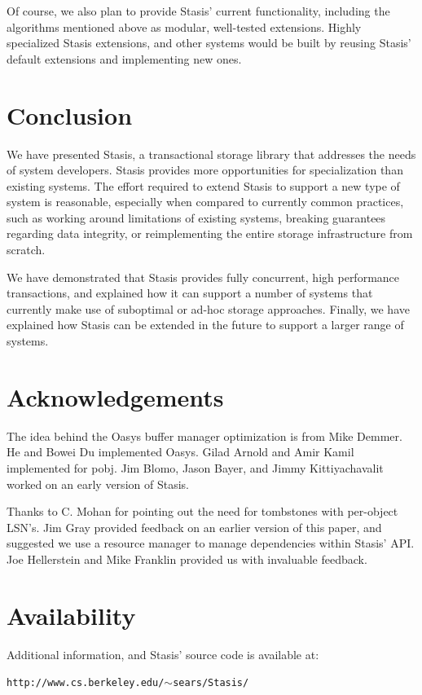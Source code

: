 \documentclass[letterpaper,twocolumn,10pt]{article}
\newcommand{\yad}{Stasis\xspace}
\newcommand{\yads}{Stasis'\xspace}
\newcommand{\oasys}{Oasys\xspace}
\begin{document}
Of course, we also plan to provide \yads current functionality, including the algorithms
mentioned above as modular, well-tested extensions.
Highly specialized \yad extensions, and other systems would be built
by reusing \yads default extensions and implementing new ones.


\section{Conclusion}

We have presented \yad, a transactional storage library that addresses
the needs of system developers.  \yad provides more opportunities for
specialization than existing systems.  The effort required to extend
\yad to support a new type of system is reasonable, especially when
compared to currently common practices, such as working around
limitations of existing systems, breaking guarantees regarding data
integrity, or reimplementing the entire storage infrastructure from
scratch.

We have demonstrated that \yad provides fully
concurrent, high performance transactions, and explained how it can
support a number of systems that currently make use of suboptimal or
ad-hoc storage approaches.  Finally, we have explained how \yad can be
extended in the future to support a larger range of systems.

\section{Acknowledgements}

The idea behind the \oasys buffer manager optimization is from Mike
Demmer.  He and Bowei Du implemented \oasys.  Gilad Arnold and Amir Kamil implemented
 for pobj.  Jim Blomo, Jason Bayer, and Jimmy
Kittiyachavalit worked on an early version of \yad.

Thanks to C. Mohan for pointing out the need for tombstones with
per-object LSN's.  Jim Gray provided feedback on an earlier version of
this paper, and suggested we use a resource manager to manage
dependencies within \yads API.  Joe Hellerstein and Mike Franklin
provided us with invaluable feedback.

\section{Availability}

Additional information, and \yads source code is available at:

\begin{center}
{\small{\tt http://www.cs.berkeley.edu/\ensuremath{\sim}sears/\yad/}}
\end{center}

{\footnotesize 
\nocite{*}
}

\theendnotes
\end{document}
